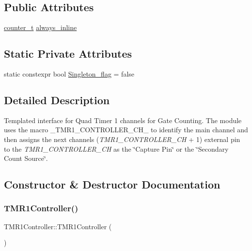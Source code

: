 \subsection*{Public Attributes}
\begin{DoxyCompactItemize}
\item 
\hyperlink{types_8hpp_ac89ac912f524b3e3fa3720ea55fec966}{counter\+\_\+t} \hyperlink{classTMR1Controller_adce8e8a496510485a88ccc5b88595672}{always\+\_\+inline}
\end{DoxyCompactItemize}
\subsection*{Static Private Attributes}
\begin{DoxyCompactItemize}
\item 
static constexpr bool \hyperlink{classTMR1Controller_a532b729ca9a7c28e5f4d221f80487241}{Singleton\+\_\+flag} = false
\end{DoxyCompactItemize}


\subsection{Detailed Description}
Templated interface for Quad Timer 1 channels for Gate Counting. The module uses the macro {\ttfamily \+\_\+\+T\+M\+R1\+\_\+\+C\+O\+N\+T\+R\+O\+L\+L\+E\+R\+\_\+\+C\+H\+\_\+} to identify the main channel and then assigns the next channel\textquotesingle{}s ({\itshape T\+M\+R1\+\_\+\+C\+O\+N\+T\+R\+O\+L\+L\+E\+R\+\_\+\+CH} + 1) external pin to the {\itshape T\+M\+R1\+\_\+\+C\+O\+N\+T\+R\+O\+L\+L\+E\+R\+\_\+\+CH} as the \char`\"{}\+Capture Pin\char`\"{} or the \char`\"{}\+Secondary Count Source\char`\"{}. 

\subsection{Constructor \& Destructor Documentation}
\mbox{\label{classTMR1Controller_aebc677e795f673c6520d5a03eb6aa4f2}} 
\subsubsection{\texorpdfstring{T\+M\+R1\+Controller()}{TMR1Controller()}}
{\footnotesize\ttfamily T\+M\+R1\+Controller\+::\+T\+M\+R1\+Controller (\begin{DoxyParamCaption}{ }\end{DoxyParamCaption})\hspace{0.3cm}{\ttfamily [inline]}}



